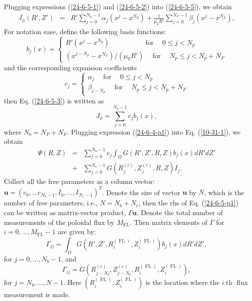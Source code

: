 \documentclass{llncs}
\newcommand{\tmop}[1]{\ensuremath{\operatorname{#1}}}
\begin{document}
Plugging expressions (\ref{24-6-5-1}) and (\ref{24-6-5-2}) into
(\ref{24-6-5-5}), we obtain
\begin{eqnarray}
  J_{\phi} (R', Z') & = & R' \sum_{j = 0}^{N_p - 1} \alpha_j (x^j - x^{N_p}) +
  \frac{1}{\mu_0 R'} \sum_{j = 0}^{N_F - 1} \beta_j (x^j - x^{N_F}), 
  \label{24-6-5-3}
\end{eqnarray}
For notation ease, define the following basis functions:
\begin{equation}
  b_j (x) = \left\{ \begin{array}{l}
    R' (x^j - x^{N_p}) \hspace{5em} \tmop{for} \quad 0 \leqslant j < N_p\\
    (x^{j - N_p} - x^{N_F}) / (\mu_0 R') \quad \tmop{for} \quad N_p \leqslant
    j < N_p + N_F
  \end{array} \right.
\end{equation}
and the corresponding expansion coefficients
\begin{equation}
  c_j = \left\{ \begin{array}{l}
    \alpha_j \quad \tmop{for} \quad 0 \leqslant j < N_p\\
    \beta_{j - N_p} \quad \tmop{for} \quad N_p \leqslant j < N_p + N_F
  \end{array} \right.
\end{equation}
then Eq. (\ref{24-6-5-3}) is written as
\begin{equation}
  \label{24-6-4-p1} J_{\phi} = \sum_{j = 0}^{N_b - 1} c_j b_j (x),
\end{equation}
where $N_b = N_P + N_F$. Plugging expression (\ref{24-6-4-p1}) into Eq.
(\ref{10-31-1}), we obtain
\begin{eqnarray}
  \Psi (R, Z) & = & \sum_{j = 0}^{N_b - 1} c_j \int_{\Omega} G (R', Z', R, Z)
  b_j (x) d R' d Z' \nonumber\\
  & + & \sum_{j = 0}^{N_c - 1} G (R_j^{(c)}, Z_j^{(c)}, R, Z) I_j . 
  \label{24-6-5-p1}
\end{eqnarray}
Collect all the free parameters as a column vector: $\mathbf{u}= (c_0, \ldots
c_{N_b - 1}, I_0, \ldots, I_{N_c - 1})^T$. Denote the size of vector
$\mathbf{u}$ by $N$, which is the number of free parameters, i.e., $N = N_b +
N_c$, then the rhs of Eq. (\ref{24-6-5-p1}) can be written as matrix-vector
product, $\Gamma \mathbf{u}$. Denote the total number of measurements of the
poloidal flux by $M_{\tmop{FL}}$. Then matrix elements of $\Gamma$ for $i = 0,
\ldots, M_{\tmop{FL}} - 1$ are given by:
\begin{equation}
  \Gamma_{i j} = \int_{\Omega} G (R', Z', R_i^{(\tmop{FL})},
  Z_i^{(\tmop{FL})}) b_j (x) d R' d Z',
\end{equation}
for $j = 0, \ldots, N_b - 1$, and
\begin{equation}
  \Gamma_{i j} = G (R_{j - N_b}^{(c)}, Z_{j - N_b}^{(c)}, R_i^{(\tmop{FL})},
  Z_i^{(\tmop{FL})}),
\end{equation}
for $j = N_b, \ldots, N - 1$. Here $(R_i^{(\tmop{FL})}, Z_i^{(\tmop{FL})})$ is
the location where the $i \tmop{th}$ flux measurement is made.
\end{document}
